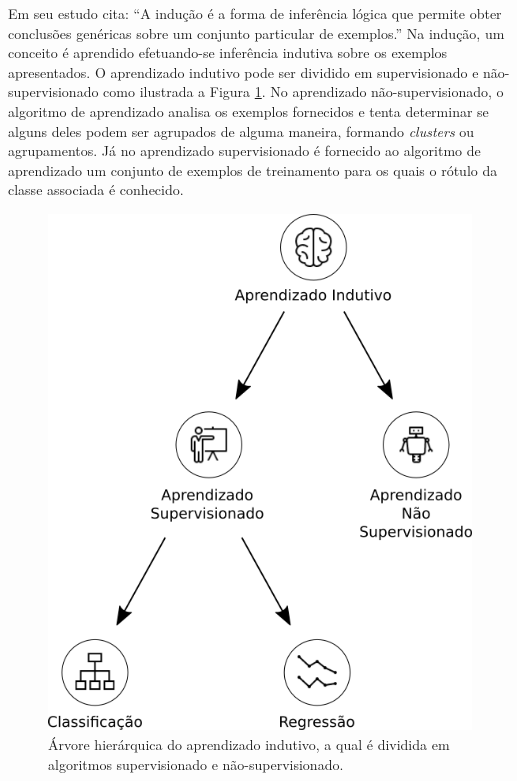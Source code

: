 Em seu estudo \cite{monard_baranauskas:2003} cita: ``A indução é a forma de 
inferência lógica que permite obter conclusões genéricas sobre um conjunto 
particular de exemplos.'' Na indução, um conceito é aprendido efetuando-se 
inferência indutiva sobre os exemplos apresentados. O aprendizado indutivo 
pode ser dividido em supervisionado e não-supervisionado como ilustrada a 
Figura \ref{figure:aprendizado_indutivo}. No aprendizado não-supervisionado, o 
algoritmo de aprendizado analisa os exemplos fornecidos e tenta determinar se 
alguns deles podem ser agrupados de alguma maneira, formando \textit{clusters} 
ou agrupamentos. Já no aprendizado supervisionado é fornecido ao algoritmo de 
aprendizado um conjunto de exemplos de treinamento para os quais o rótulo da 
classe associada é conhecido.

\begin{figure}[H]
\begin{center}
    \includegraphics[scale=0.40]{images/aprendizado_indutivo.png}
\end{center}
\caption{Árvore hierárquica do aprendizado indutivo, a qual é dividida em 
algoritmos supervisionado e não-supervisionado.}
\label{figure:aprendizado_indutivo}
\end{figure}

